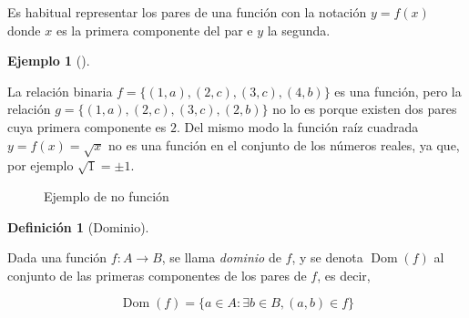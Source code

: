 \documentclass[
  a4paper,
]{scrreport}
\theoremstyle{plain}
\theoremstyle{plain}
\theoremstyle{definition}
\newtheorem{definition}{Definición}[chapter]
\theoremstyle{plain}
\theoremstyle{definition}
\newtheorem{example}{Ejemplo}[chapter]
\theoremstyle{remark}
\begin{document}
Es habitual representar los pares de una función con la notación
\(y=f(x)\) donde \(x\) es la primera componente del par e \(y\) la
segunda.

\leavevmode{}%
\begin{example}[]\label{exm-funcion}

La relación binaria \(f=\{(1,a), (2,c), (3,c), (4,b)\}\) es una función,
pero la relación \(g=\{(1,a), (2,c), (3,c), (2,b)\}\) no lo es porque
existen dos pares cuya primera componente es \(2\). Del mismo modo la
función raíz cuadrada \(y=f(x)=\sqrt{x}\) no es una función en el
conjunto de los números reales, ya que, por ejemplo \(\sqrt{1}=\pm 1\).

\end{example}

\begin{figure}

\begin{minipage}[t]{0.50\linewidth}

{\centering 

\raisebox{-\height}{



}

\caption{Ejemplo de función}

}

\end{minipage}%
%
\begin{minipage}[t]{0.50\linewidth}

{\centering 

\raisebox{-\height}{



}

\caption{Ejemplo de no función}

}

\end{minipage}%

\end{figure}

\leavevmode{}%
\begin{definition}[Dominio]\label{def-dominio-funcion}

Dada una función \(f:A\rightarrow B\), se llama \emph{dominio} de \(f\),
y se denota \(\operatorname{Dom}(f)\) al conjunto de las primeras
componentes de los pares de \(f\), es decir,

\[\operatorname{Dom}(f) = \{a\in A: \exists b\in B, (a,b)\in f\}\]

\end{definition}
\end{document}
